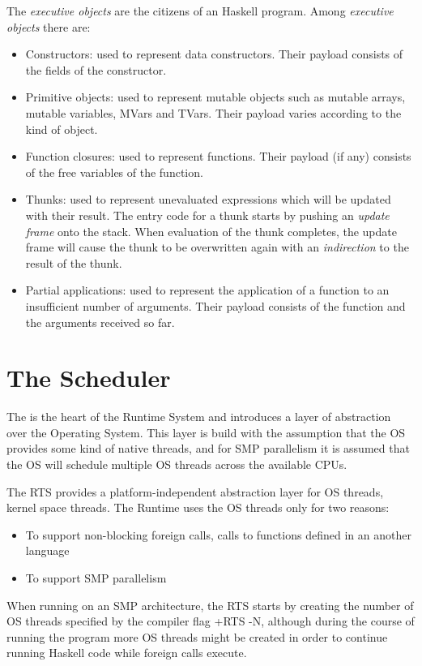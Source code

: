 The \emph{executive objects} are the citizens of an Haskell program. Among \emph{executive objects} there are:
\begin{itemize}
\item Constructors: used to represent data constructors. Their payload consists of the fields of the constructor.
\item Primitive objects: used to represent mutable objects such as mutable arrays, mutable variables, MVars and TVars. Their payload varies according to the kind of object.
\item Function closures: used to represent functions. Their payload (if any) consists of the free variables of the function.
\item Thunks: used to represent unevaluated expressions which will be updated with their result. The entry code for a thunk starts by pushing an \emph{update frame} onto the stack. When evaluation of the thunk completes, the update frame will cause the thunk to be overwritten again with an \emph{indirection} to the result of the thunk.
\item Partial applications: used to represent the application of a function to an insufficient number of arguments. Their payload consists of the function and the arguments received so far.
\end{itemize}

\section{The Scheduler}
The   is the heart of the Runtime System and introduces a layer of abstraction over the Operating System.
This layer is build with the assumption that the OS provides some kind of native threads, and for SMP parallelism it is assumed that the OS will schedule multiple OS threads across the available CPUs.

The RTS provides a platform-independent abstraction layer for OS threads, \ie kernel space threads. The Runtime uses the OS threads only for two reasons:
\begin{itemize}
\item To support non-blocking foreign calls, \ie calls to functions defined in an another language
\item To support SMP parallelism
\end{itemize}
When running on an SMP architecture, the RTS starts by creating the number of OS threads specified by the compiler flag +RTS -N, although during the course of running the program more OS threads might be created in order to continue running Haskell code while foreign calls execute.

